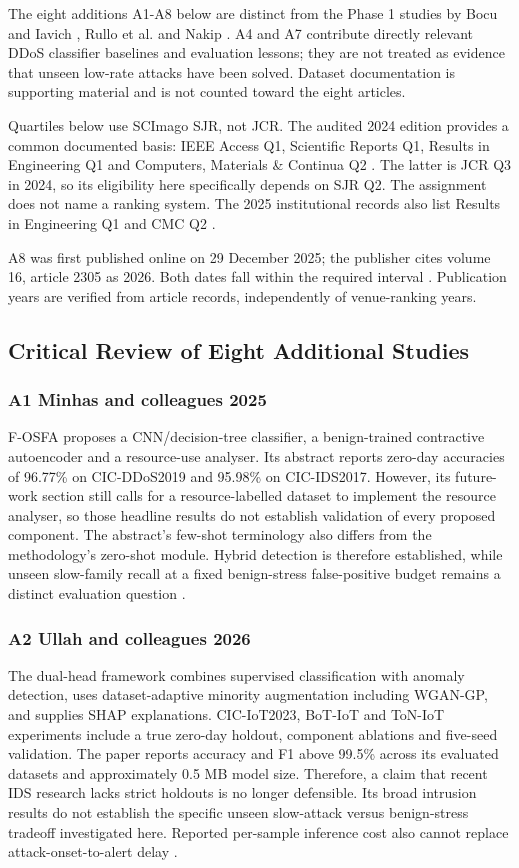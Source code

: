 \documentclass[conference]{IEEEtran}
\begin{document}
The eight additions A1-A8 below are distinct from the Phase 1 studies by Bocu and Iavich \cite{ref1}, Rullo et al. \cite{ref2} and Nakip \cite{ref3}. A4 and A7 contribute directly relevant DDoS classifier baselines and evaluation lessons; they are not treated as evidence that unseen low-rate attacks have been solved. Dataset documentation is supporting material and is not counted toward the eight articles.

Quartiles below use SCImago SJR, not JCR. The audited 2024 edition provides a common documented basis: IEEE Access Q1, Scientific Reports Q1, Results in Engineering Q1 and Computers, Materials \& Continua Q2 \cite{ref15,ref16,ref17,ref18}. The latter is JCR Q3 in 2024, so its eligibility here specifically depends on SJR Q2. The assignment does not name a ranking system. The 2025 institutional records also list Results in Engineering Q1 and CMC Q2 \cite{ref17,ref18}.

A8 was first published online on 29 December 2025; the publisher cites volume 16, article 2305 as 2026. Both dates fall within the required interval \cite{ref11}. Publication years are verified from article records, independently of venue-ranking years.

\subsection{Critical Review of Eight Additional Studies}
\subsubsection{A1 Minhas and colleagues 2025}
F-OSFA proposes a CNN/decision-tree classifier, a benign-trained contractive autoencoder and a resource-use analyser. Its abstract reports zero-day accuracies of 96.77\% on CIC-DDoS2019 and 95.98\% on CIC-IDS2017. However, its future-work section still calls for a resource-labelled dataset to implement the resource analyser, so those headline results do not establish validation of every proposed component. The abstract's few-shot terminology also differs from the methodology's zero-shot module. Hybrid detection is therefore established, while unseen slow-family recall at a fixed benign-stress false-positive budget remains a distinct evaluation question \cite{ref4}.

\subsubsection{A2 Ullah and colleagues 2026}
The dual-head framework combines supervised classification with anomaly detection, uses dataset-adaptive minority augmentation including WGAN-GP, and supplies SHAP explanations. CIC-IoT2023, BoT-IoT and ToN-IoT experiments include a true zero-day holdout, component ablations and five-seed validation. The paper reports accuracy and F1 above 99.5\% across its evaluated datasets and approximately 0.5 MB model size. Therefore, a claim that recent IDS research lacks strict holdouts is no longer defensible. Its broad intrusion results do not establish the specific unseen slow-attack versus benign-stress tradeoff investigated here. Reported per-sample inference cost also cannot replace attack-onset-to-alert delay \cite{ref5}.
\end{document}
